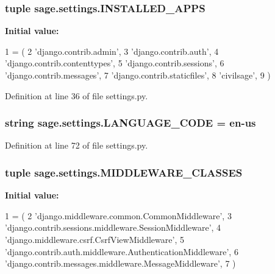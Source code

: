 \subsubsection[{I\+N\+S\+T\+A\+L\+L\+E\+D\+\_\+\+A\+P\+P\+S}]{\setlength{\rightskip}{0pt plus 5cm}tuple sage.\+settings.\+I\+N\+S\+T\+A\+L\+L\+E\+D\+\_\+\+A\+P\+P\+S}\label{a00043_af48e999a4a4e7f8830d84ac4eb08df1a}
{\bfseries Initial value\+:}
\begin{DoxyCode}
1 = (
2     \textcolor{stringliteral}{'django.contrib.admin'},
3     \textcolor{stringliteral}{'django.contrib.auth'},
4     \textcolor{stringliteral}{'django.contrib.contenttypes'},
5     \textcolor{stringliteral}{'django.contrib.sessions'},
6     \textcolor{stringliteral}{'django.contrib.messages'},
7     \textcolor{stringliteral}{'django.contrib.staticfiles'},
8     \textcolor{stringliteral}{'civilsage'},
9 )
\end{DoxyCode}


Definition at line 36 of file settings.\+py.

\hypertarget{a00043_ac5b7a49ef37a25508ecb84453063821a}{}
\subsubsection[{L\+A\+N\+G\+U\+A\+G\+E\+\_\+\+C\+O\+D\+E}]{\setlength{\rightskip}{0pt plus 5cm}string sage.\+settings.\+L\+A\+N\+G\+U\+A\+G\+E\+\_\+\+C\+O\+D\+E = \textquotesingle{}en-\/us\textquotesingle{}}\label{a00043_ac5b7a49ef37a25508ecb84453063821a}


Definition at line 72 of file settings.\+py.

\hypertarget{a00043_a247a0ea3c79f999897dbfaed3bc99b1d}{}
\subsubsection[{M\+I\+D\+D\+L\+E\+W\+A\+R\+E\+\_\+\+C\+L\+A\+S\+S\+E\+S}]{\setlength{\rightskip}{0pt plus 5cm}tuple sage.\+settings.\+M\+I\+D\+D\+L\+E\+W\+A\+R\+E\+\_\+\+C\+L\+A\+S\+S\+E\+S}\label{a00043_a247a0ea3c79f999897dbfaed3bc99b1d}
{\bfseries Initial value\+:}
\begin{DoxyCode}
1 = (
2     \textcolor{stringliteral}{'django.middleware.common.CommonMiddleware'},
3     \textcolor{stringliteral}{'django.contrib.sessions.middleware.SessionMiddleware'},
4     \textcolor{stringliteral}{'django.middleware.csrf.CsrfViewMiddleware'},
5     \textcolor{stringliteral}{'django.contrib.auth.middleware.AuthenticationMiddleware'},
6     \textcolor{stringliteral}{'django.contrib.messages.middleware.MessageMiddleware'},
7 )
\end{DoxyCode}


